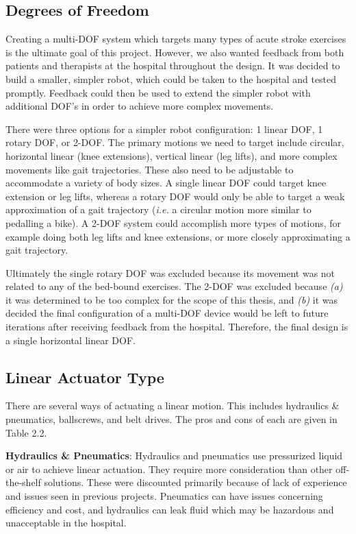 \documentclass[12pt]{report}
\begin{document}
	
		\subsection{Degrees of Freedom}
		
		Creating a multi-DOF system which targets many types of acute stroke exercises is the ultimate goal of this project. However, we also wanted feedback from both patients and therapists at the hospital throughout the design. It was decided to build a smaller, simpler robot, which could be taken to the hospital and tested promptly. Feedback could then be used to extend the simpler robot with additional DOF's in order to achieve more complex movements.
		
		There were three options for a simpler robot configuration: 1 linear DOF, 1 rotary DOF, or 2-DOF. The primary motions we need to target include circular, horizontal linear (knee extensions), vertical linear (leg lifts), and more complex movements like gait trajectories. These also need to be adjustable to accommodate a variety of body sizes. A single linear DOF could target knee extension or leg lifts, whereas a rotary DOF would only be able to target a weak approximation of a gait trajectory (\textit{i.e.} a circular motion more similar to pedalling a bike). A 2-DOF system could accomplish more types of motions, for example doing both leg lifts and knee extensions, or more closely approximating a gait trajectory.
		
		Ultimately the single rotary DOF was excluded because its movement was not related to any of the bed-bound exercises. The 2-DOF was excluded because \textit{(a)} it was determined to be too complex for the scope of this thesis, and \textit{(b)} it was decided the final configuration of a multi-DOF device would be left to future iterations after receiving feedback from the hospital. Therefore, the final design is a single horizontal linear DOF. 

					
		\subsection{Linear Actuator Type}

	There are several ways of actuating a linear motion. This includes hydraulics \& pneumatics, ballscrews, and belt drives. The pros and cons of each are given in Table 2.2.
	
	\textbf{Hydraulics \& Pneumatics}: Hydraulics and pneumatics use pressurized liquid or air to achieve linear actuation. They require more consideration than other off-the-shelf solutions. These were discounted primarily because of lack of experience and issues seen in previous projects. Pneumatics can have issues concerning efficiency and cost, and hydraulics can leak fluid which may be hazardous and unacceptable in the hospital. 
\end{document}
